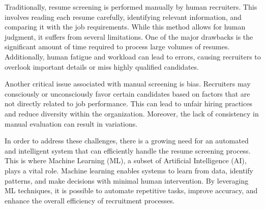 \vspace{6pt}
{%
Traditionally, resume screening is performed manually by human recruiters. This involves reading each resume carefully, identifying relevant information, and comparing it with the job requirements. While this method allows for human judgment, it suffers from several limitations. One of the major drawbacks is the significant amount of time required to process large volumes of resumes. Additionally, human fatigue and workload can lead to errors, causing recruiters to overlook important details or miss highly qualified candidates.}

\vspace{6pt}
{%
Another critical issue associated with manual screening is bias. Recruiters may consciously or unconsciously favor certain candidates based on factors that are not directly related to job performance. This can lead to unfair hiring practices and reduce diversity within the organization. Moreover, the lack of consistency in manual evaluation can result in variations.}

\vspace{6pt}
{%
In order to address these challenges, there is a growing need for an automated and intelligent system that can efficiently handle the resume screening process. This is where Machine Learning (ML), a subset of Artificial Intelligence (AI), plays a vital role. Machine learning enables systems to learn from data, identify patterns, and make decisions with minimal human intervention. By leveraging ML techniques, it is possible to automate repetitive tasks, improve accuracy, and enhance the overall efficiency of recruitment processes.}

